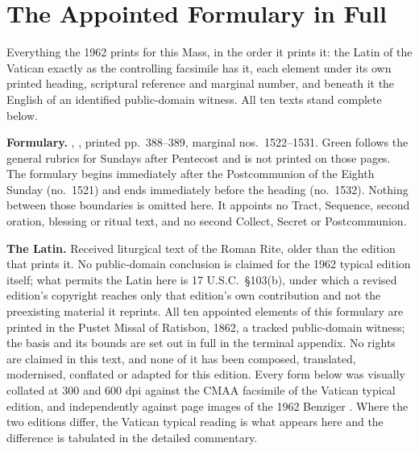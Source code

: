 \section*{The Appointed Formulary in Full}

Everything the 1962  prints for this Mass, in the order
it prints it: the Latin of the Vatican  exactly as the
controlling facsimile has it, each element under its own printed heading,
scriptural reference and marginal number, and beneath it the English of an
identified public-domain witness. All ten texts stand complete below.

\textbf{Formulary.} , , printed pp.~388--389, marginal nos.\ 1522--1531. Green follows the
general rubrics for Sundays after Pentecost and is not printed on those pages.
The formulary begins immediately after the Postcommunion of the Eighth Sunday
(no.\ 1521) and ends immediately before the heading  (no.\ 1532). Nothing between those boundaries is omitted
here. It appoints no Tract, Sequence, second oration, blessing or ritual text,
and no second Collect, Secret or Postcommunion.

\textbf{The Latin.} Received liturgical text of the Roman Rite, older than the
edition that prints it. No public-domain conclusion is claimed for the 1962
typical edition itself; what permits the Latin here is 17 U.S.C.\ \S103(b),
under which a revised edition's copyright reaches only that edition's own
contribution and not the preexisting material it reprints. All ten appointed
elements of this formulary are printed in the Pustet Missal of Ratisbon, 1862,
a tracked public-domain witness; the basis and its bounds are set out in full
in the terminal appendix. No rights are claimed
in this text, and none of it has been composed, translated, modernised,
conflated or adapted for this edition. Every form below was visually
collated at 300 and 600 dpi against the CMAA facsimile of the Vatican typical
edition, and independently against page images of the 1962 Benziger
. Where the two editions differ, the Vatican
typical reading is what appears here and the difference is tabulated in the
detailed commentary.

